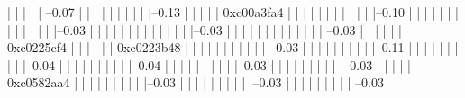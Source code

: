             |          |          |          |          |           --0.07%
            |          |          |          |          |          
            |          |          |          |          |--0.13%
            |          |          |          |          |          0xc00a3fa4
            |          |          |          |          |          |          
            |          |          |          |          |          |--0.10%
            |          |          |          |          |          |          |          
            |          |          |          |          |          |          |--0.03%
            |          |          |          |          |          |          |          
            |          |          |          |          |          |          |--0.03%
            |          |          |          |          |          |          |          
            |          |          |          |          |          |           --0.03%
            |          |          |          |          |          |                     0xc0225cf4
            |          |          |          |          |          |                     0xc0223b48
            |          |          |          |          |          |          
            |          |          |          |          |           --0.03%
            |          |          |          |          |          
            |          |          |          |          |--0.11%
            |          |          |          |          |          
            |          |          |          |          |--0.04%
            |          |          |          |          |          
            |          |          |          |          |--0.04%
            |          |          |          |          |          
            |          |          |          |          |--0.03%
            |          |          |          |          |          
            |          |          |          |          |--0.03%
            |          |          |          |          |          0xc0582aa4
            |          |          |          |          |          
            |          |          |          |          |--0.03%
            |          |          |          |          |          
            |          |          |          |          |--0.03%
            |          |          |          |          |          
            |          |          |          |           --0.03%
